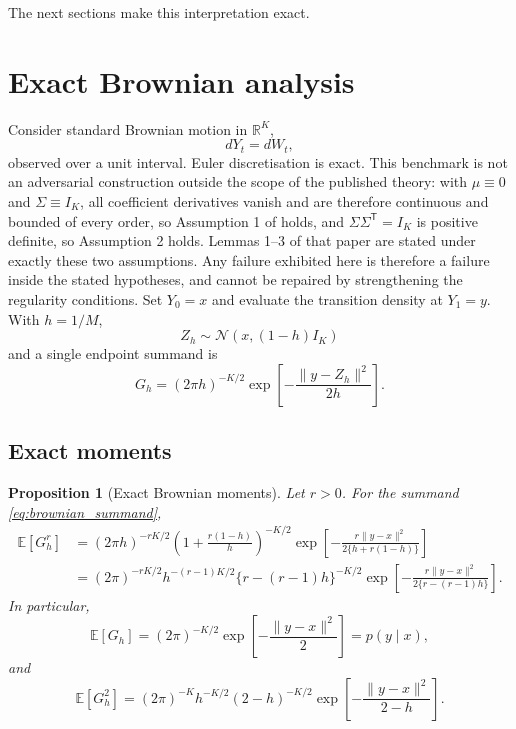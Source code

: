 \documentclass[11pt]{article}
\newtheorem{proposition}[proposition]{Proposition}
\theoremstyle{definition}
\newcommand{\R}{\mathbb{R}}
\newcommand{\E}{\mathbb{E}}
\newcommand{\Normal}{\mathcal{N}}
\begin{document}
The next sections make this interpretation exact.

\FloatBarrier
\section{Exact Brownian analysis}\label{sec:brownian}

Consider standard Brownian motion in $\R^K$,
\begin{equation}\label{eq:brownian}
dY_t=dW_t,
\end{equation}
observed over a unit interval. Euler discretisation is exact. This benchmark is not an adversarial construction outside the scope of the published theory: with $\mu\equiv0$ and $\Sigma\equiv I_K$, all coefficient derivatives vanish and are therefore continuous and bounded of every order, so Assumption 1 of \citet{BrandtSantaClara2002} holds, and $\Sigma\Sigma^{\mathsf T}=I_K$ is positive definite, so Assumption 2 holds. Lemmas 1--3 of that paper are stated under exactly these two assumptions. Any failure exhibited here is therefore a failure inside the stated hypotheses, and cannot be repaired by strengthening the regularity conditions. Set $Y_0=x$ and evaluate the transition density at $Y_1=y$. With $h=1/M$,
\[
Z_h\sim\Normal(x,(1-h)I_K)
\]
and a single endpoint summand is
\begin{equation}\label{eq:brownian_summand}
G_h
=(2\pi h)^{-K/2}
\exp\!\left[-\frac{\|y-Z_h\|^2}{2h}\right].
\end{equation}

\subsection{Exact moments}

\begin{proposition}[Exact Brownian moments]\label{prop:brownian_moments}
Let $r>0$. For the summand \eqref{eq:brownian_summand},
\begin{align}
\E[G_h^r]
&=(2\pi h)^{-rK/2}
\left(1+\frac{r(1-h)}{h}\right)^{-K/2}
\exp\!\left[
-\frac{r\|y-x\|^2}{2\{h+r(1-h)\}}
\right] \label{eq:brownian_r_moment}\\
&=(2\pi)^{-rK/2}
 h^{-(r-1)K/2}
\{r-(r-1)h\}^{-K/2}
\exp\!\left[
-\frac{r\|y-x\|^2}{2\{r-(r-1)h\}}
\right]. \nonumber
\end{align}
In particular,
\begin{equation}\label{eq:brownian_mean}
\E[G_h]=(2\pi)^{-K/2}\exp\!\left[-\frac{\|y-x\|^2}{2}\right]
=p(y\mid x),
\end{equation}
and
\begin{equation}\label{eq:brownian_second}
\E[G_h^2]
=(2\pi)^{-K}h^{-K/2}(2-h)^{-K/2}
\exp\!\left[-\frac{\|y-x\|^2}{2-h}\right].
\end{equation}
\end{proposition}
\end{document}
